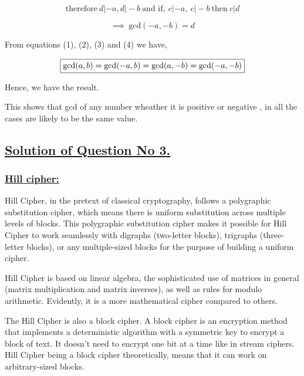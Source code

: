 \documentclass[a4paper,12pt]{article}
\begin{document}
    $$\mbox{therefore}\ d|-a, d|-b\  \mbox{and if},\ c|-a,\ c|-b\ \mbox{then}\ c|d$$

    \begin{equation*}
        \implies\ \mbox{gcd}(-a,-b) = d \tag{4}
    \end{equation*}

    From equations (1), (2), (3) and (4) we have, 

    \begin{align*}
        \boxed{$$\mbox{gcd}(a,b) = \mbox{gcd}(-a,b) = \mbox{gcd}(a,-b) = \mbox{gcd}(-a,-b)$$}
    \end{align*}


    Hence, we have the result.

    \vspace*{2cm}
    
    This shows that gcd of any number wheather it is positive or negative , in all the cases are likely to be the same value.

    \pagebreak

    \subsection*{\underline{Solution of Question No 3.}}

    \subsubsection*{\underline{Hill cipher:}}

    Hill Cipher, in the pretext of classical cryptography, follows a polygraphic substitution cipher, which means there is uniform substitution across multiple levels of blocks. This polygraphic substitution cipher makes it possible for Hill Cipher to work seamlessly with digraphs (two-letter blocks), trigraphs (three-letter blocks), or any multiple-sized blocks for the purpose of building a uniform cipher.

   Hill Cipher is based on linear algebra, the sophisticated use of matrices in general (matrix multiplication and matrix inverses), as well as rules for modulo arithmetic. Evidently, it is a more mathematical cipher compared to others.

   The Hill Cipher is also a block cipher. A block cipher is an encryption method that implements a deterministic algorithm with a symmetric key to encrypt a block of text. It doesn't need to encrypt one bit at a time like in stream ciphers. Hill Cipher being a block cipher theoretically, means that it can work on arbitrary-sized blocks.
\end{document}
